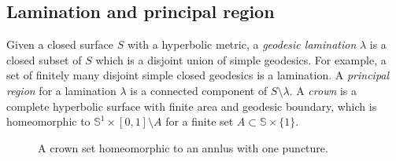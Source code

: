 \documentclass[reqno]{amsart}
\theoremstyle{plain}
\theoremstyle{definition}
\theoremstyle{remark}
\theoremstyle{definition}
\newcommand{\?}{\textcolor{red}{?}}
\begin{document}
\subsection{Lamination and principal region}

Given a closed surface $S$ with a hyperbolic metric, a \textit{geodesic lamination} $\lambda$ is a closed subset of $S$ which is a disjoint union of simple geodesics. For example, a set of finitely many disjoint simple closed geodesics is a lamination. A \textit{principal region} for a lamination $\lambda$ is a connected component of $S\setminus \lambda$. A \textit{crown} is a complete hyperbolic surface with finite area and geodesic boundary, which is homeomorphic to $\mathbb{S}^1\times [0,1]\setminus A$ for a finite set $A\subset \mathbb{S}\times \{1\}$.
\begin{figure}[ht]
    \centering
    \caption{A crown set homeomorphic to an annlus with one puncture.}
\end{figure}
\end{document}
